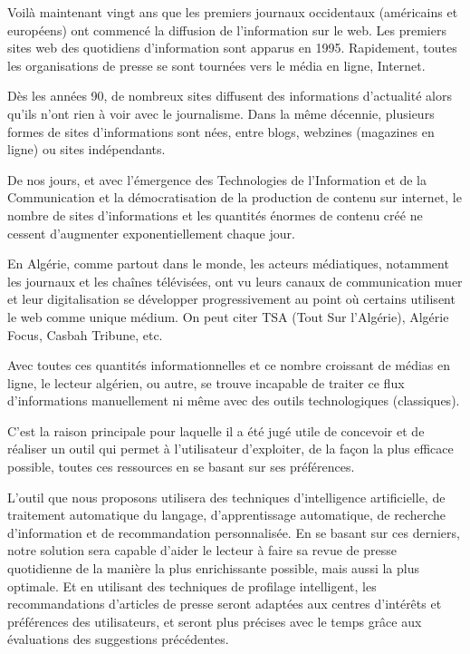 
\newpage

Voilà maintenant vingt ans que les premiers journaux occidentaux (américains et européens) ont commencé la diffusion de l'information sur le web. Les premiers sites web des quotidiens d'information sont apparus en 1995. Rapidement, toutes les organisations de presse se sont tournées vers le média en ligne, Internet.

Dès les années 90, de nombreux sites diffusent des informations d'actualité alors qu'ils n'ont rien à voir avec le journalisme. Dans la même décennie, plusieurs formes de sites d'informations sont nées, entre blogs, webzines (magazines en ligne) ou sites indépendants.

De nos jours, et avec l'émergence des Technologies de l'Information et de la Communication et la démocratisation de la production de contenu sur internet, le nombre de sites d'informations et les quantités énormes de contenu créé ne cessent d'augmenter exponentiellement chaque jour.

En Algérie, comme partout dans le monde, les acteurs médiatiques, notamment les journaux et les chaînes télévisées, ont vu leurs canaux de communication muer et leur digitalisation se développer progressivement au point où certains utilisent le web comme unique médium. On peut citer TSA (Tout Sur l'Algérie), Algérie Focus, Casbah Tribune, etc.

Avec toutes ces quantités informationnelles et ce nombre croissant de médias en ligne, le lecteur algérien, ou autre, se trouve incapable de traiter ce flux d'informations manuellement ni même avec des outils technologiques (classiques). 

C'est la raison principale pour laquelle il a été jugé utile de concevoir et de réaliser un outil qui permet à l'utilisateur d'exploiter, de la façon la plus efficace possible, toutes ces ressources en se basant sur ses préférences.

L'outil que nous proposons utilisera des techniques d'intelligence artificielle, de traitement automatique du langage, d'apprentissage automatique, de recherche d'information et de recommandation personnalisée. En se basant sur ces derniers, notre solution sera capable d'aider le lecteur à faire sa revue de presse quotidienne de la manière la plus enrichissante possible, mais aussi la plus optimale. Et en utilisant des techniques de profilage intelligent, les recommandations d'articles de presse seront adaptées aux centres d'intérêts et préférences des utilisateurs, et seront plus précises avec le temps grâce aux évaluations des suggestions précédentes.

